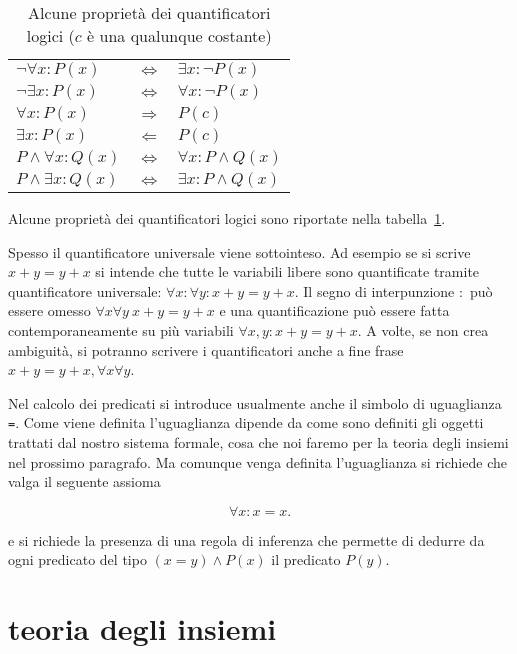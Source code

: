 \begin{table}
\begin{center}
\begin{tabular}{lcl}
$\lnot \forall x \colon P(x)$ & $\iff$ & $\exists x \colon \lnot P(x)$\\
$\lnot \exists x \colon P(x)$ & $\iff$ & $\forall x \colon \lnot P(x)$\\
$\forall x \colon P(x)$ & $\Longrightarrow$ & $P(c)$\\
$\exists x \colon P(x)$ & $\Longleftarrow$ & $P(c)$\\
$P \land \forall x \colon Q(x)$ & $\iff$ & $\forall x\colon P\land Q(x)$\\
$P \land \exists x \colon Q(x)$ & $\iff$ & $\exists x \colon P \land Q(x)$
\end{tabular}
\end{center}
\caption{Alcune proprietà dei quantificatori logici ($c$ è una qualunque costante)}
\label{tab:proprieta_quantificatori}
\end{table}

Alcune proprietà dei quantificatori logici sono riportate
nella tabella~\ref{tab:proprieta_quantificatori}.

Spesso il quantificatore universale viene sottointeso.
Ad esempio se si scrive $x+y=y+x$
si intende che tutte le variabili libere sono quantificate 
tramite quantificatore universale: 
$\forall x\colon \forall y\colon x+y=y+x$.
Il segno di interpunzione $\colon$ può essere omesso
$\forall x \forall y\ x+y=y+x$
e una quantificazione può essere fatta contemporaneamente 
su più variabili $\forall x,y\colon x+y = y+x$.
A volte, se non crea ambiguità, si potranno scrivere 
i quantificatori anche a fine frase $x+y=y+x, \forall x\forall y$.

Nel calcolo dei predicati si introduce usualmente anche il simbolo di uguaglianza \texttt{=}.
Come viene definita l'uguaglianza dipende da come sono definiti gli oggetti trattati 
dal nostro sistema formale, cosa che noi faremo per la teoria degli insiemi nel prossimo paragrafo.
Ma comunque venga definita l'uguaglianza si richiede che valga il seguente assioma
\begin{axiom}[uguaglianza]
\[
  \forall x\colon x=x.  
\]
\end{axiom}
e si richiede la presenza di una regola di inferenza che permette di dedurre 
da ogni predicato del tipo $(x=y) \land P(x)$ il predicato $P(y)$.

\section{teoria degli insiemi}

